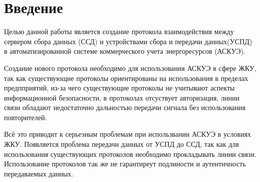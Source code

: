 \newpage
\section{Введение}
\setcounter{figure}{0}


Целью данной работы является создание протокола взаимодействия между сервером сбора данных (ССД) и устройствами сбора и передачи данных(УСПД) в автоматизированной системе коммерческого учета энергоресурсов (АСКУЭ).

Создание нового протокола необходимо для использования АСКУЭ в сфере ЖКУ, так как существующие протоколы ориентированы на использования в пределах предпприятий, из-за чего существующие протоколы не учитывают аспекты информационной безопасности, в протоколах отсуствует авторизация, линии связи обладают недостаточно дальностью передачи сигнала без использования повторителей. 

Всё это приводит к серьезным проблемам при использвании АСКУЭ в условиях ЖКУ. Появляется проблема передачи данных от УСПД до ССД, так как для использования существующих протоколов необходимо прокладывать линии связи. Использование протоколов так же не гарантиреут подлиности и аутентичность передаваемых данных. 

